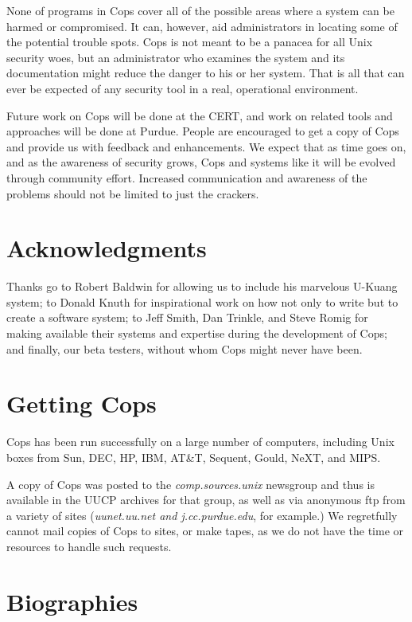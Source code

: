 None of programs in {\sc Cops} cover all of the possible areas where a
system can be harmed or compromised.  It can, however, aid
administrators in locating some of the potential trouble spots. {\sc
Cops} is not meant to be a panacea for all {\sc Unix} security woes,
but an administrator who examines the system and its documentation
might reduce the danger to his or her system.  That is all that can
ever be expected of any security tool in a real, operational
environment.

Future work on {\sc Cops} will be done at the CERT, and work on related
tools and approaches will be done at Purdue.
People are encouraged to get a copy of {\sc Cops}  and provide us with feedback
and enhancements.   We expect that as time goes on, and as the
awareness of security grows, {\sc Cops} and systems like it will be
evolved through community effort.  Increased communication and
awareness of the problems should not be limited to just the crackers.

\section{Acknowledgments}

Thanks go to Robert Baldwin for allowing us to include his marvelous
U-Kuang system; to Donald Knuth for inspirational work on how
not only to write but to create a software system; to Jeff Smith,
Dan Trinkle, and Steve Romig for making available their
systems and expertise during the development of {\sc Cops}; and finally, our beta testers, 
without whom {\sc Cops}  might never have been.

\appendix
\section*{Getting {\sc Cops}}

{\sc Cops} has been run successfully on a large number of computers, including
{\sc Unix} boxes from Sun, DEC, HP, IBM, AT\&T, Sequent, Gould, NeXT, and MIPS.

A copy of {\sc Cops}  was posted to the {\it comp.sources.unix} newsgroup
and thus is available in the UUCP archives for that group, as well
as via anonymous ftp from a variety of sites ({\it uunet.uu.net {\rm and}
j.cc.purdue.edu}, for example.)
We regretfully cannot mail copies of {\sc Cops} to sites, or make tapes,
as we do not have the time or resources to handle such requests.

\section*{Biographies}

